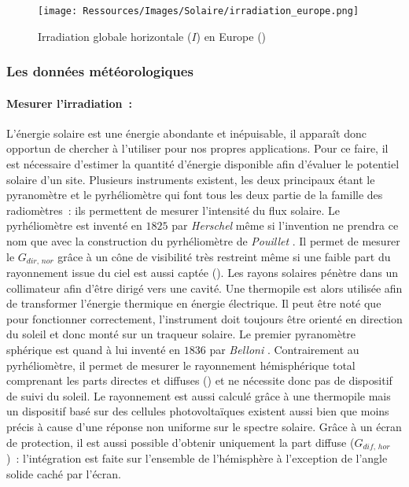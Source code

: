 \begin{figure}
    \centering
    \texttt{[image: Ressources/Images/Solaire/irradiation\_europe.png]}
    \caption[Irradiation globale horizontale en Europe]
            {Irradiation globale horizontale ($I$) en Europe ()}
    \label{fig:gisement_solaire}
\end{figure}


\subsubsection{Les données météorologiques} %
\label{ssub:les_donnees_meteorologiques}
\paragraph{Mesurer l’irradiation~:} %
\label{par:mesurer_l_irradiation_}
L’énergie solaire est une énergie abondante et inépuisable, il apparaît donc opportun
de chercher à l’utiliser pour nos propres applications. Pour ce faire, il est nécessaire
d’estimer la quantité d’énergie disponible afin d’évaluer le potentiel solaire d’un site.
Plusieurs instruments existent, les deux principaux étant le pyranomètre et le
pyrhéliomètre qui font tous les deux partie de la famille des radiomètres~: ils permettent
de mesurer l’intensité du flux solaire. Le pyrhéliomètre est inventé en $1825$ par
\textit{Herschel} \parencite{Kutz2013} même si l’invention ne prendra ce nom que avec la
construction du pyrhéliomètre de \textit{Pouillet} \parencite{Boer1985}. Il permet de
mesurer le $G_{dir,\,nor}$ grâce à un cône de visibilité très restreint même si une faible
part du rayonnement issue du ciel est aussi captée ().
Les rayons solaires pénètre dans un collimateur afin d’être dirigé vers une cavité. Une
thermopile est alors utilisée afin de transformer l’énergie thermique en énergie
électrique. Il peut être noté que pour fonctionner correctement, l’instrument doit
toujours être orienté en direction du soleil et donc monté sur un traqueur solaire. Le
premier pyranomètre sphérique est quand à lui inventé en $1836$ par \textit{Belloni}
\parencite{Boer1985}. Contrairement au pyrhéliomètre, il permet de mesurer le rayonnement
hémisphérique total comprenant les parts directes et diffuses () et ne nécessite donc pas
de dispositif de suivi du soleil. Le rayonnement est aussi calculé grâce à une thermopile
mais un dispositif basé sur des cellules photovoltaïques existent aussi bien que moins
précis à cause d’une réponse non uniforme sur le spectre solaire. Grâce à un écran de
protection, il est aussi possible d’obtenir uniquement la part diffuse ($G_{dif,\,hor}$)~: l’intégration
est faite sur l’ensemble de l’hémisphère à l’exception de l’angle solide caché par
l’écran.

